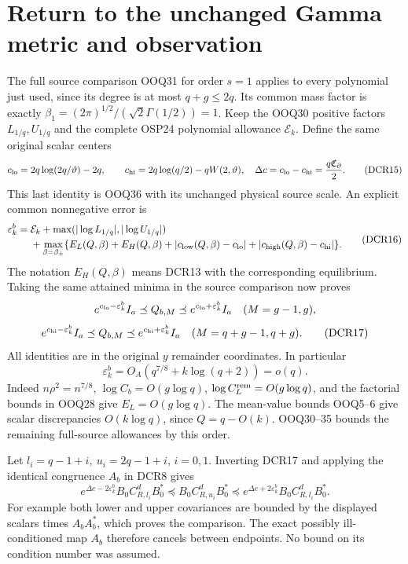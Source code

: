 \documentclass[11pt]{article}
\begin{document}
\section{Return to the unchanged Gamma metric and observation}

The full source comparison OOQ31 for order \(s=1\) applies to every
polynomial just used, since its degree is at most \(q+g\le2q\).
Its common mass factor is exactly
\(\beta_1=(2\pi)^{1/2}/(\sqrt2\Gamma(1/2))=1\).
Keep the OOQ30 positive factors \(L_{1/q},U_{1/q}\) and the
complete OSP24 polynomial allowance \(\mathcal E_k\).
Define the same original scalar centers
\[
c_{\rm lo}=2q\log(2q/\vartheta)-2q,\qquad
c_{\rm hi}=2q\log(q/2)-qW(2,\vartheta),
\quad \Delta c=c_{\rm lo}-c_{\rm hi}=\frac{q\mathfrak C_\partial}{2}.
\tag{DCR15}
\]
This last identity is OOQ36 with its unchanged physical source scale.
An explicit common nonnegative error is
\[
\begin{split}
\varepsilon_k^b={}&\mathcal E_k+
 \max(|\log L_{1/q}|,|\log U_{1/q}|)\\
&+\max_{\beta=\beta_\pm}
 \{E_L(Q,\beta)+E_H(Q,\beta)
 +|c_{\rm low}(Q,\beta)-c_{\rm lo}|
 +|c_{\rm high}(Q,\beta)-c_{\rm hi}|\}.
\end{split}\tag{DCR16}
\]
The notation \(E_H(Q,\beta)\) means DCR13 with the corresponding
equilibrium. Taking the same attained minima in the source
comparison now proves
\[
e^{c_{\rm lo}-\varepsilon_k^b}I_a\preceq Q_{b,M}
 \preceq e^{c_{\rm lo}+\varepsilon_k^b}I_a
 \quad(M=g-1,g),
\]
\[
e^{c_{\rm hi}-\varepsilon_k^b}I_a\preceq Q_{b,M}
 \preceq e^{c_{\rm hi}+\varepsilon_k^b}I_a
 \quad(M=q+g-1,q+g).
\tag{DCR17}
\]
All identities are in the original \(y\) remainder coordinates.
In particular
\[
\varepsilon_k^b=O_A(q^{7/8}+k\log(q+2))=o(q).
\tag{DCR18}
\]
Indeed \(n\rho^2=n^{7/8}\), \(\log C_b=O(g\log q)\),
\(\log C_L^{\rm rem}=O(g\log q)\), and the factorial bounds
in OOQ28 give \(E_L=O(g\log q)\).
The mean-value bounds OOQ5--6 give scalar discrepancies
\(O(k\log q)\), since \(Q=q-O(k)\).
OOQ30--35 bounds the remaining full-source allowances by this order.

Let \(l_i=q-1+i,\ u_i=2q-1+i\), \(i=0,1\).
Inverting DCR17 and applying the identical congruence \(A_b\)
in DCR8 gives
\[
e^{\Delta c-2\varepsilon_k^b}B_0C_{R,l_i}^dB_0^*
\preceq B_0C_{R,u_i}^dB_0^*
\preceq e^{\Delta c+2\varepsilon_k^b}B_0C_{R,l_i}^dB_0^*.
\tag{DCR19}
\]
For example both lower and upper covariances are bounded by the
displayed scalars times \(A_bA_b^*\), which proves the comparison.
The exact possibly ill-conditioned map \(A_b\) therefore cancels
between endpoints. No bound on its condition number was assumed.
\end{document}
